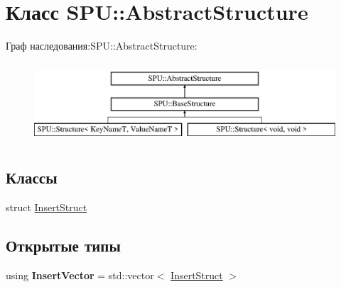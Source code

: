 \hypertarget{class_s_p_u_1_1_abstract_structure}{}\section{Класс S\+PU\+:\+:Abstract\+Structure}
\label{class_s_p_u_1_1_abstract_structure}
Граф наследования\+:S\+PU\+:\+:Abstract\+Structure\+:\begin{figure}[H]
\begin{center}
\leavevmode
\includegraphics[height=3.000000cm]{class_s_p_u_1_1_abstract_structure}
\end{center}
\end{figure}
\subsection*{Классы}
\begin{DoxyCompactItemize}
\item 
struct \hyperlink{struct_s_p_u_1_1_abstract_structure_1_1_insert_struct}{Insert\+Struct}
\end{DoxyCompactItemize}
\subsection*{Открытые типы}
\begin{DoxyCompactItemize}
\item 
\mbox{\label{class_s_p_u_1_1_abstract_structure_aa6f066b5548474e4330fb9439de690b5}} 
using {\bfseries Insert\+Vector} = std\+::vector$<$ \hyperlink{struct_s_p_u_1_1_abstract_structure_1_1_insert_struct}{Insert\+Struct} $>$
\end{DoxyCompactItemize}
